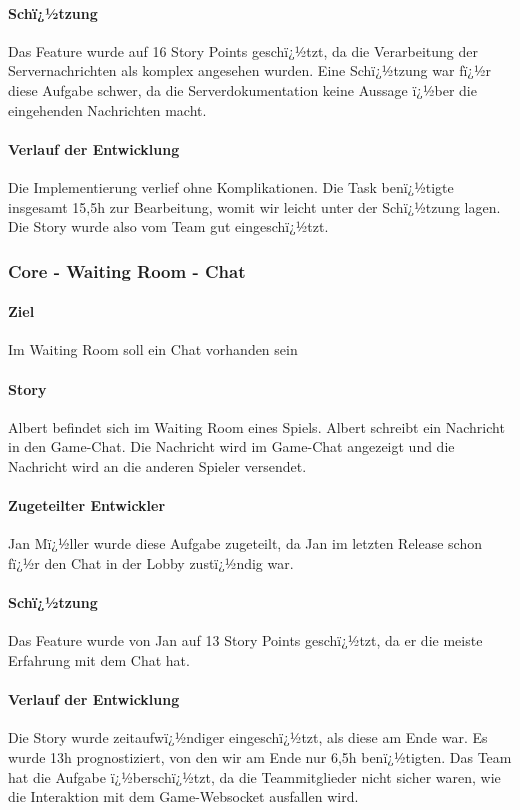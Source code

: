 \documentclass[12pt, titlepage]{scrartcl}
\begin{document}
		\paragraph{Schï¿½tzung}
		Das Feature wurde auf 16 Story Points geschï¿½tzt, da die Verarbeitung der Servernachrichten als komplex angesehen wurden. Eine Schï¿½tzung war fï¿½r diese Aufgabe schwer, da die Serverdokumentation keine Aussage ï¿½ber die eingehenden Nachrichten macht.
		\paragraph{Verlauf der Entwicklung} 
		Die Implementierung verlief ohne Komplikationen. Die Task benï¿½tigte insgesamt 15,5h zur Bearbeitung, womit wir leicht unter der Schï¿½tzung lagen. Die Story wurde also vom Team gut eingeschï¿½tzt.
		
		\subsubsection{Core - Waiting Room - Chat}
		\paragraph{Ziel} Im Waiting Room soll ein Chat vorhanden sein
		\paragraph{Story} Albert befindet sich im Waiting Room eines Spiels. Albert schreibt ein Nachricht in den Game-Chat. Die Nachricht wird im Game-Chat angezeigt und die Nachricht wird an die anderen Spieler versendet.
		\paragraph{Zugeteilter Entwickler} Jan Mï¿½ller wurde diese Aufgabe zugeteilt, da Jan im letzten Release schon fï¿½r den Chat in der Lobby zustï¿½ndig war.
		\paragraph{Schï¿½tzung}
		Das Feature wurde von Jan auf 13 Story Points geschï¿½tzt, da er die meiste Erfahrung mit dem Chat hat.
		\paragraph{Verlauf der Entwicklung} 
		Die Story wurde zeitaufwï¿½ndiger eingeschï¿½tzt, als diese am Ende war. Es wurde 13h prognostiziert, von den wir am Ende nur 6,5h benï¿½tigten. Das Team hat die Aufgabe ï¿½berschï¿½tzt, da die Teammitglieder nicht sicher waren, wie die Interaktion mit dem Game-Websocket ausfallen wird.
		
\end{document}
